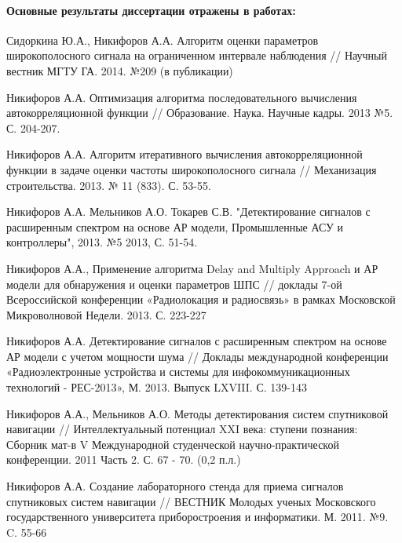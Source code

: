 \paragraph{Основные результаты диссертации отражены в работах:}
\begin{enumerate}
	{\bf{
	\item Сидоркина Ю.А., Никифоров А.А. Алгоритм оценки параметров широкополосного сигнала на ограниченном интервале наблюдения //
		Научный вестник МГТУ ГА. 2014. №209 (в публикации)
	\item Никифоров А.А. Оптимизация алгоритма последовательного вычисления автокорреляционной функции //
		Образование. Наука. Научные кадры. 2013 №5. С. 204-207.
	\item Никифоров А.А. Алгоритм итеративного вычисления автокорреляционной функции в задаче оценки частоты широкополосного сигнала //
		Механизация строительства. 2013. № 11 (833). С. 53-55.
	\item Никифоров А.А. Мельников А.О. Токарев С.В. "Детектирование сигналов с расширенным спектром на основе АР модели,
		Промышленные АСУ и контроллеры", 2013. №5 2013, С. 51-54.
	}}

	\item Никифоров А.А., Применение алгоритма Delay and Multiply Approach и АР модели для обнаружения и оценки параметров ШПС //
		доклады 7-ой Всероссийской конференции «Радиолокация и радиосвязь» в рамках Московской Микроволновой Недели. 2013. С. 223-227 
	\item Никифоров А.А. Детектирование сигналов с расширенным спектром на основе АР модели с учетом мощности шума // Доклады международной конференции
		«Радиоэлектронные устройства и системы для инфокоммуникационных технологий - РЕС-2013», М. 2013. Выпуск LXVIII. С. 139-143
	\item Никифоров А.А., Мельников А.О. Методы детектирования систем спутниковой навигации // Интеллектуальный потенциал XXI века:
		ступени познания: Сборник мат-в V Международной студенческой научно-практической конференции. 2011 Часть 2. С. 67 - 70. (0,2 п.л.)

	\item Никифоров А.А. Создание лабораторного стенда для приема сигналов спутниковых систем навигации // ВЕСТНИК Молодых ученых Московского
		государственного университета приборостроения и информатики. М. 2011. №9. C. 55-66
\end{enumerate}
